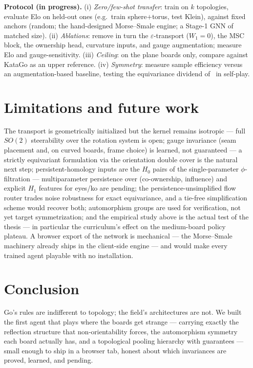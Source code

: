 \documentclass[11pt]{article}
\newcommand{\eps}{\varepsilon}
\begin{document}
\textbf{Protocol (in progress).} (i) \emph{Zero/few-shot transfer}: train
on $k$ topologies, evaluate Elo on held-out ones (e.g.\ train
sphere$+$torus, test Klein), against fixed anchors (random; the
hand-designed Morse--Smale engine; a Stage-1 GNN of matched size).
(ii) \emph{Ablations}: remove in turn the $\eps$-transport ($W_1{=}0$),
the MSC block, the ownership head, curvature inputs, and gauge
augmentation; measure Elo and gauge-sensitivity. (iii) \emph{Ceiling}: on
the plane boards only, compare against KataGo as an upper reference.
(iv) \emph{Symmetry}: measure sample efficiency versus an
augmentation-based baseline, testing the equivariance dividend
of~\cite{elesedy2021} in self-play.

\section{Limitations and future work}
The transport is geometrically initialized but the kernel remains
isotropic --- full $SO(2)$ steerability over the rotation system is
open; gauge invariance (seam placement and, on curved boards, frame
choice) is learned, not guaranteed --- a
strictly equivariant formulation via the orientation double cover is the
natural next step; persistent-homology inputs are the $H_0$ pairs of the
single-parameter $\phi$-filtration --- multiparameter persistence over
(co-ownership, influence) and explicit $H_1$ features for eyes/ko are
pending; the persistence-unsimplified flow router trades noise
robustness for exact equivariance, and a tie-free simplification scheme
would recover both; automorphism groups are used for verification, not
yet target symmetrization; and the empirical study above is the actual
test of the thesis --- in particular the curriculum's effect on the
medium-board policy plateau. A browser export of the network
is mechanical --- the Morse--Smale machinery already ships in the
client-side engine --- and would make every trained agent playable with
no installation.

\section{Conclusion}
Go's rules are indifferent to topology; the field's architectures are
not. We built the first agent that plays where the boards get strange ---
carrying exactly the reflection structure that non-orientability forces,
the automorphism symmetry each board actually has, and a topological
pooling hierarchy with guarantees --- small enough to ship in a browser
tab, honest about which invariances are proved, learned, and pending.
\end{document}
